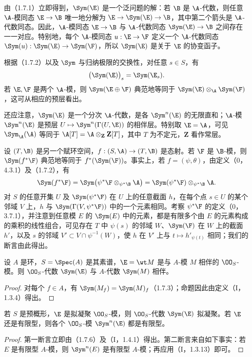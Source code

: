 由（1.7.1）立即得到，$\Sym(\E)$ 是一个泛问题的解：若 $\B$ 是 $\A$-代数，则任意 $\A$-模同态 $\E\to\B$ 唯一地分解为
$\E\to\Sym(\E)\to\B$，其中第二个箭头是 $\A$-代数同态。因此，$\A$-模同态 $\E\to\B$ 与 $\A$-代数同态 $\Sym(\E)\to\B$ 之间存在一一对应。特别地，每个 $\A$-模同态 $u:\E\to\F$ 定义一个 $\A$-代数同态 $\Sym(u):\Sym(\E)\to\Sym(\F)$，所以 $\Sym(\E)$ 是关于 $\E$ 的协变函子。

根据（1.7.2）以及 $\Sym$ 与归纳极限的交换性，对任意 $s\in S$，有
\[
\bigl(\Sym(\E)\bigr)_s=\Sym(\E_s).
\]
若 $\E,\F$ 是两个 $\A$-模，则 $\Sym(\E\oplus\F)$ 典范地等同于 $\Sym(\E)\otimes_\A\Sym(\F)$，这可从相应的预层看出。

还应注意，$\Sym(\E)$ 是一个分次 $\A$-代数，是各 $\Sym^n(\E)$ 的无限直和；$\A$-模 $\Sym^n(\E)$ 是预层 $U\mapsto\Sym^n(\Gamma(U,\E))$ 的相伴层。特别取 $\E=\A$，可见 $\Sym_\A(\A)$ 等同于
$\A[T]=\A\otimes_{\mathbf Z}\mathbf Z[T]$，其中 $T$ 为不定元，$\mathbf Z$ 看作常层。

设 $(T,\B)$ 是另一个赋环空间，$f:(S,\A)\to(T,\B)$ 是态射。若 $\F$ 是 $\B$-模，则 $\Sym(f^*\F)$ 典范地等同于 $f^*(\Sym(\F))$。事实上，若 $f=(\psi,\theta)$，由定义（0，4.3.1）及（1.7.2），有
\[
\Sym(f^*\F)
=\Sym\bigl(\psi^*\F\otimes_{\psi^*\B}\A\bigr)
=\Sym(\psi^*\F)\otimes_{\psi^*\B}\A.
\]
对 $S$ 的任意开集 $U$ 及 $\Sym(\psi^*\F)$ 在 $U$ 上的任意截面 $h$，在每个点 $s\in U$ 的某个邻域 $V$ 上，$h$ 与 $\Sym(\Gamma(V,\psi^*\F))$ 中的一个元素相同。考察 $\psi^*\F$ 的定义（0，3.7.1），并注意到任意模 $E$ 的 $\Sym(E)$ 中的元素，都是有限多个由 $E$ 的元素构成的乘积的线性组合，可见存在 $T$ 中 $\psi(s)$ 的邻域 $W$、$\Sym(\F)$ 在 $W$ 上的截面 $h'$，以及 $s$ 的邻域 $V'\subset V\cap\psi^{-1}(W)$，使 $h$ 在 $V'$ 上与 $t\mapsto h'_{\psi(t)}$ 相同；我们的断言由此得出。

设 $A$ 是环，$S=\Spec(A)$ 是其素谱，$\E=\wt M$ 是与 $A$-模 $M$ 相伴的 $\OO_S$-模。则 $\OO_S$-代数 $\Sym(\E)$ 与 $A$-代数 $\Sym(M)$ 相伴。
\begin{proof}
对每个 $f\in A$，有 $\Sym(M_f)=\Sym(M)_f$（1.7.3）；命题因此由定义（I，1.3.4）得出。
\end{proof}

若 $S$ 是预概形，$\E$ 是拟凝聚 $\OO_S$-模，则 $\OO_S$-代数 $\Sym(\E)$ 拟凝聚。若 $\E$ 还是有限型，则各个 $\OO_S$-模 $\Sym^n(\E)$ 都是有限型。
\begin{proof}
第一断言立即由（1.7.6）及（I，1.4.1）得出。第二断言来自如下事实：若 $E$ 是有限型 $A$-模，则 $\Sym^n(E)$ 是有限型 $A$-模；再应用（I，1.3.13）即可。
\end{proof}

